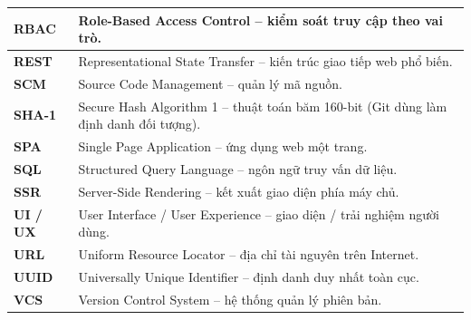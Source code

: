 \begin{longtable}{|>{\bfseries}p{2.8cm}|p{11.0cm}|}
RBAC   & Role-Based Access Control -- kiểm soát truy cập theo vai trò.\\\hline
REST   & Representational State Transfer -- kiến trúc giao tiếp web phổ biến.\\\hline
SCM    & Source Code Management -- quản lý mã nguồn.\\\hline
SHA-1  & Secure Hash Algorithm 1 -- thuật toán băm 160-bit (Git dùng làm định danh đối tượng).\\\hline
SPA    & Single Page Application -- ứng dụng web một trang.\\\hline
SQL    & Structured Query Language -- ngôn ngữ truy vấn dữ liệu.\\\hline
SSR    & Server-Side Rendering -- kết xuất giao diện phía máy chủ.\\\hline
UI / UX & User Interface / User Experience -- giao diện / trải nghiệm người dùng.\\\hline
URL    & Uniform Resource Locator -- địa chỉ tài nguyên trên Internet.\\\hline
UUID   & Universally Unique Identifier -- định danh duy nhất toàn cục.\\\hline
VCS    & Version Control System -- hệ thống quản lý phiên bản.\\\hline
\end{longtable}
\clearpage
